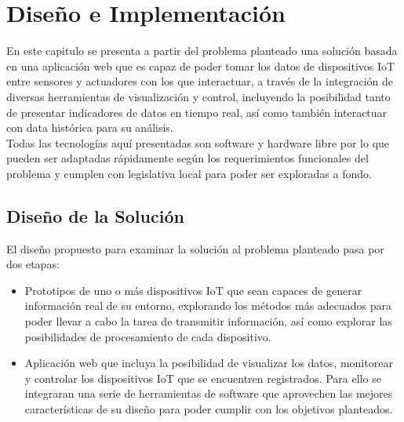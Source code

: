

\chapter{Diseño e Implementación}
En este capitulo se presenta a partir del problema planteado una solución basada en una aplicación web que es capaz de poder tomar los datos de dispositivos IoT entre sensores y actuadores con los que interactuar, a través de la integración de diversas herramientas de visualización y control, incluyendo la posibilidad tanto de presentar indicadores de datos en tiempo real, así como también interactuar con data histórica para su análisis.\\

Todas las tecnologías aquí presentadas son software y hardware libre por lo que pueden ser adaptadas rápidamente según los requerimientos funcionales del problema y cumplen con legislativa local para poder ser exploradas a fondo. 

\section{Diseño de la Solución}
El diseño propuesto para examinar la solución al problema planteado pasa por dos etapas:
\begin{itemize}
\item Prototipos de uno o más dispositivos IoT que sean capaces de generar información real de su entorno, explorando los métodos más adecuados para poder llevar a cabo la tarea de transmitir información, así como explorar las posibilidades de procesamiento de cada dispositivo.
\item Aplicación web que incluya la posibilidad de visualizar los datos, monitorear y controlar los dispositivos IoT que se encuentren registrados. Para ello se integraran una serie de herramientas de software que aprovechen las mejores características de su diseño para poder cumplir con los objetivos planteados.
\end{itemize}

